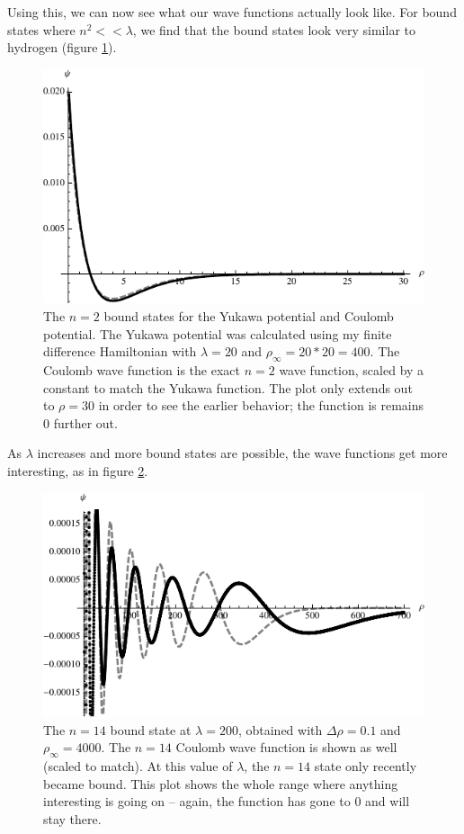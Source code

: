 \documentclass[12pt,twoside]{reedthesis}
\begin{document}
Using this, we can now see what our wave functions actually look like. For bound states where $n^2 << \lambda$, we find that the bound states look very similar to hydrogen (figure \ref{fig:hyd-yukawa}).
\begin{figure}[h]
\centering
\includegraphics{Figures/n2hydyukawa}
\caption[The $n = 2$ bound states for the Yukawa potential and Coulomb potential]{The $n = 2$ bound states for the Yukawa potential and Coulomb potential. The Yukawa potential was calculated using my finite difference Hamiltonian with $\lambda = 20$ and  $\rho_{\infty} = 20*20 = 400$. The Coulomb wave function is the exact $n=2$ wave function, scaled by a constant to match the Yukawa function. The plot only extends out to $\rho = 30$ in order to see the earlier behavior; the function is remains 0 further out.}
\label{fig:hyd-yukawa}
\end{figure}
As $\lambda$ increases and more bound states are possible, the wave functions get more interesting, as in figure \ref{fig:largebound}.
\begin{figure}[h]
\centering
\includegraphics{Figures/largebound}
\caption[The $n=14$ bound state at $\lambda = 200$]{The $n=14$ bound state at $\lambda = 200$, obtained with $\Delta \rho = 0.1$ and $\rho_{\infty} = 4000$. The $n=14$ Coulomb wave function is shown as well (scaled to match). At this value of $\lambda$, the $n=14$ state only recently became bound. This plot shows the whole range where anything interesting is going on -- again, the function has gone to 0 and will stay there.}
\label{fig:largebound}
\end{figure}
\end{document}
